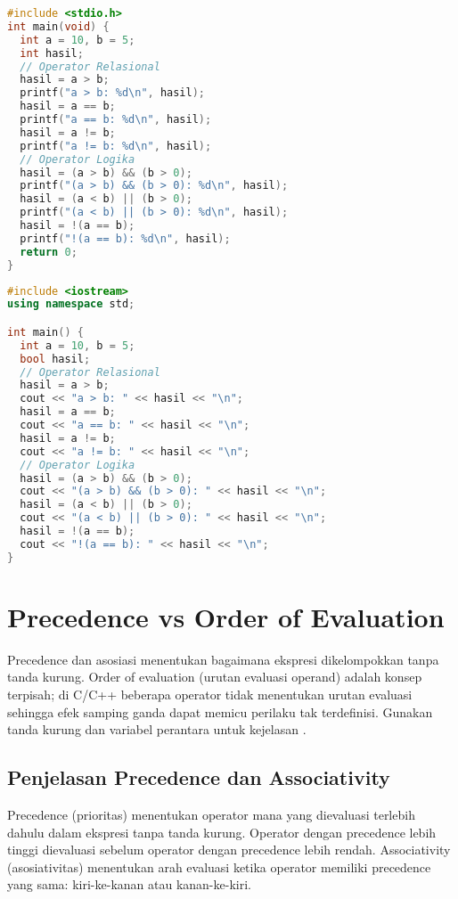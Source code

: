 \documentclass[../main.tex]{subfiles}
\begin{document}
\begin{lstlisting}[language=C, caption={Operator relasional dan logika di C}]
#include <stdio.h>
int main(void) {
  int a = 10, b = 5;
  int hasil;
  // Operator Relasional
  hasil = a > b;
  printf("a > b: %d\n", hasil);
  hasil = a == b;
  printf("a == b: %d\n", hasil);
  hasil = a != b;
  printf("a != b: %d\n", hasil);
  // Operator Logika
  hasil = (a > b) && (b > 0);
  printf("(a > b) && (b > 0): %d\n", hasil);
  hasil = (a < b) || (b > 0);
  printf("(a < b) || (b > 0): %d\n", hasil);
  hasil = !(a == b);
  printf("!(a == b): %d\n", hasil);
  return 0;
}
\end{lstlisting}

\begin{lstlisting}[language=C++, caption={Operator relasional dan logika di C++}]
#include <iostream>
using namespace std;

int main() {
  int a = 10, b = 5;
  bool hasil;
  // Operator Relasional
  hasil = a > b;
  cout << "a > b: " << hasil << "\n";
  hasil = a == b;
  cout << "a == b: " << hasil << "\n";
  hasil = a != b;
  cout << "a != b: " << hasil << "\n";
  // Operator Logika
  hasil = (a > b) && (b > 0);
  cout << "(a > b) && (b > 0): " << hasil << "\n";
  hasil = (a < b) || (b > 0);
  cout << "(a < b) || (b > 0): " << hasil << "\n";
  hasil = !(a == b);
  cout << "!(a == b): " << hasil << "\n";
}
\end{lstlisting}

\section{Precedence vs Order of Evaluation}
Precedence dan asosiasi menentukan bagaimana ekspresi dikelompokkan tanpa tanda kurung. Order of evaluation (urutan evaluasi operand) adalah konsep terpisah; di C/C++ beberapa operator tidak menentukan urutan evaluasi sehingga efek samping ganda dapat memicu perilaku tak terdefinisi. Gunakan tanda kurung dan variabel perantara untuk kejelasan \parencite{gnu-c-manual,cpp-op-precedence,c-op-precedence,c-order-of-eval,cpp-order-of-eval}.

\subsection{Penjelasan Precedence dan Associativity}
Precedence (prioritas) menentukan operator mana yang dievaluasi terlebih dahulu dalam ekspresi tanpa tanda kurung. Operator dengan precedence lebih tinggi dievaluasi sebelum operator dengan precedence lebih rendah. Associativity (asosiativitas) menentukan arah evaluasi ketika operator memiliki precedence yang sama: kiri-ke-kanan atau kanan-ke-kiri.
\end{document}
